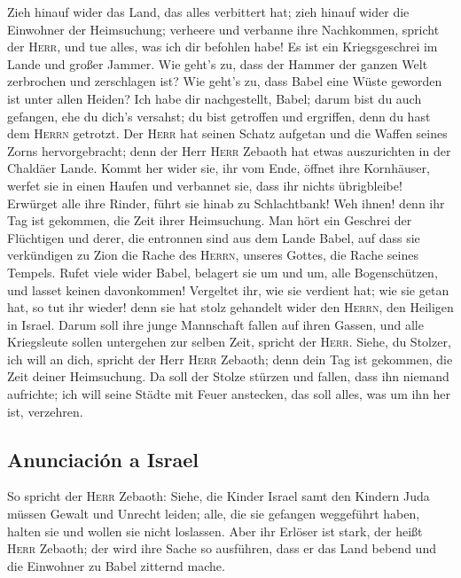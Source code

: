  Zieh hinauf wider das Land, das alles verbittert hat;
zieh hinauf wider die Einwohner der Heimsuchung; verheere und verbanne
ihre Nachkommen, spricht der \textsc{Herr}, und tue alles, was ich dir
befohlen habe!  Es ist ein Kriegsgeschrei im Lande und
großer Jammer.  Wie geht's zu, dass der Hammer der ganzen
Welt zerbrochen und zerschlagen ist? Wie geht's zu, dass Babel eine
Wüste geworden ist unter allen Heiden?  Ich habe dir
nachgestellt, Babel; darum bist du auch gefangen, ehe du dich's
versahst; du bist getroffen und ergriffen, denn du hast dem
\textsc{Herrn} getrotzt.  Der \textsc{Herr} hat seinen
Schatz aufgetan und die Waffen seines Zorns hervorgebracht; denn der
Herr \textsc{Herr} Zebaoth hat etwas auszurichten in der Chaldäer Lande.
 Kommt her wider sie, ihr vom Ende, öffnet ihre
Kornhäuser, werfet sie in einen Haufen und verbannet sie, dass ihr
nichts übrigbleibe!  Erwürget alle ihre Rinder, führt sie
hinab zu Schlachtbank! Weh ihnen! denn ihr Tag ist gekommen, die Zeit
ihrer Heimsuchung.  Man hört ein Geschrei der Flüchtigen
und derer, die entronnen sind aus dem Lande Babel, auf dass sie
verkündigen zu Zion die Rache des \textsc{Herrn}, unseres Gottes, die
Rache seines Tempels.  Rufet viele wider Babel, belagert
sie um und um, alle Bogenschützen, und lasset keinen davonkommen!
Vergeltet ihr, wie sie verdient hat; wie sie getan hat, so tut ihr
wieder! denn sie hat stolz gehandelt wider den \textsc{Herrn}, den
Heiligen in Israel.  Darum soll ihre junge Mannschaft
fallen auf ihren Gassen, und alle Kriegsleute sollen untergehen zur
selben Zeit, spricht der \textsc{Herr}.  Siehe, du
Stolzer, ich will an dich, spricht der Herr \textsc{Herr} Zebaoth; denn
dein Tag ist gekommen, die Zeit deiner Heimsuchung.  Da
soll der Stolze stürzen und fallen, dass ihn niemand aufrichte; ich will
seine Städte mit Feuer anstecken, das soll alles, was um ihn her ist,
verzehren.

\hypertarget{anunciaciuxf3n-a-israel}{%
\subsection{Anunciación a Israel}\label{anunciaciuxf3n-a-israel}}

 So spricht der \textsc{Herr} Zebaoth: Siehe, die Kinder
Israel samt den Kindern Juda müssen Gewalt und Unrecht leiden; alle, die
sie gefangen weggeführt haben, halten sie und wollen sie nicht
loslassen.  Aber ihr Erlöser ist stark, der heißt
\textsc{Herr} Zebaoth; der wird ihre Sache so ausführen, dass er das
Land bebend und die Einwohner zu Babel zitternd mache.

